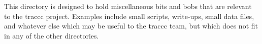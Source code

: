 This directory is designed to hold miscellaneous bits and bobs that are relevant to the traccc project. Examples include small scripts, write-\/ups, small data files, and whatever else which may be useful to the traccc team, but which does not fit in any of the other directories. 